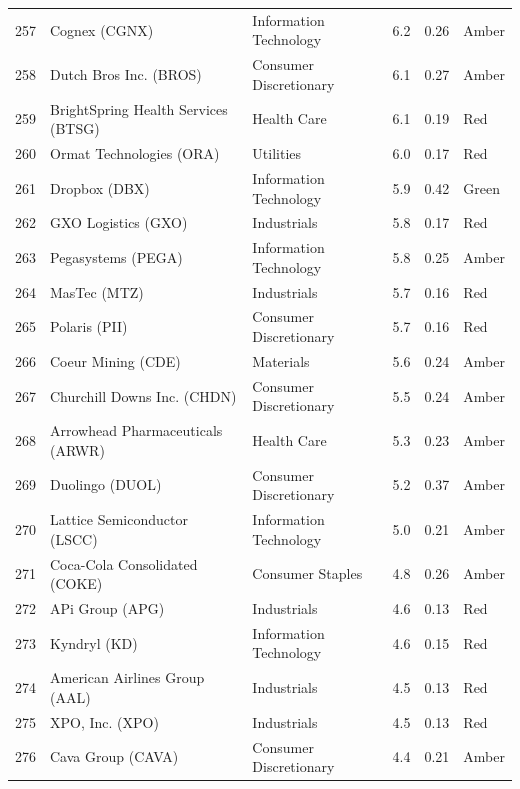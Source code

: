 \documentclass[11pt,a4paper]{article}
\begin{document}
{\begin{longtable}{r p{4.6cm} p{3cm} r r l}
257 & Cognex (CGNX) & Information Technology & 6.2 & 0.26 & \cellcolor[HTML]{FFEB9C}Amber \\
258 & Dutch Bros Inc. (BROS) & Consumer Discretionary & 6.1 & 0.27 & \cellcolor[HTML]{FFEB9C}Amber \\
259 & BrightSpring Health Services (BTSG) & Health Care & 6.1 & 0.19 & \cellcolor[HTML]{F4B6B6}Red \\
260 & Ormat Technologies (ORA) & Utilities & 6.0 & 0.17 & \cellcolor[HTML]{F4B6B6}Red \\
261 & Dropbox (DBX) & Information Technology & 5.9 & 0.42 & \cellcolor[HTML]{C6EFCE}Green \\
262 & GXO Logistics (GXO) & Industrials & 5.8 & 0.17 & \cellcolor[HTML]{F4B6B6}Red \\
263 & Pegasystems (PEGA) & Information Technology & 5.8 & 0.25 & \cellcolor[HTML]{FFEB9C}Amber \\
264 & MasTec (MTZ) & Industrials & 5.7 & 0.16 & \cellcolor[HTML]{F4B6B6}Red \\
265 & Polaris (PII) & Consumer Discretionary & 5.7 & 0.16 & \cellcolor[HTML]{F4B6B6}Red \\
266 & Coeur Mining (CDE) & Materials & 5.6 & 0.24 & \cellcolor[HTML]{FFEB9C}Amber \\
267 & Churchill Downs Inc. (CHDN) & Consumer Discretionary & 5.5 & 0.24 & \cellcolor[HTML]{FFEB9C}Amber \\
268 & Arrowhead Pharmaceuticals (ARWR) & Health Care & 5.3 & 0.23 & \cellcolor[HTML]{FFEB9C}Amber \\
269 & Duolingo (DUOL) & Consumer Discretionary & 5.2 & 0.37 & \cellcolor[HTML]{FFEB9C}Amber \\
270 & Lattice Semiconductor (LSCC) & Information Technology & 5.0 & 0.21 & \cellcolor[HTML]{FFEB9C}Amber \\
271 & Coca-Cola Consolidated (COKE) & Consumer Staples & 4.8 & 0.26 & \cellcolor[HTML]{FFEB9C}Amber \\
272 & APi Group (APG) & Industrials & 4.6 & 0.13 & \cellcolor[HTML]{F4B6B6}Red \\
273 & Kyndryl (KD) & Information Technology & 4.6 & 0.15 & \cellcolor[HTML]{F4B6B6}Red \\
274 & American Airlines Group (AAL) & Industrials & 4.5 & 0.13 & \cellcolor[HTML]{F4B6B6}Red \\
275 & XPO, Inc. (XPO) & Industrials & 4.5 & 0.13 & \cellcolor[HTML]{F4B6B6}Red \\
276 & Cava Group (CAVA) & Consumer Discretionary & 4.4 & 0.21 & \cellcolor[HTML]{FFEB9C}Amber \\

\end{longtable}}
\end{document}
